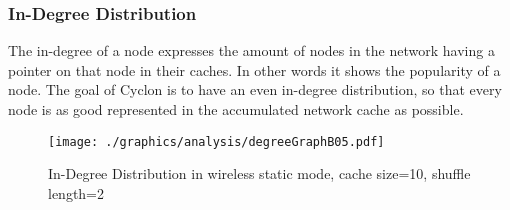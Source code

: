 \subsubsection{In-Degree Distribution}
\label{subsubsec:inDegree}
The in-degree of a node expresses the amount of nodes in the network having a
pointer on that node in their caches. In other words it shows the popularity of
a node. The goal of Cyclon is to have an even in-degree distribution, so that
every node is as good represented in the accumulated network cache as
possible.\\

\begin{figure}
	\texttt{[image: ./graphics/analysis/degreeGraphB05.pdf]}
	\caption{In-Degree Distribution in wireless static mode, cache size=10, shuffle
	length=2}
	\label{fig:inDegreeDistB05}
\end{figure}

